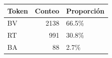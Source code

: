 \begin{tabular}{@{}lrl@{}}
\toprule
Token & Conteo & Proporción \\
\midrule
BV & 2138 & 66.5\% \\
RT & 991 & 30.8\% \\
BA & 88 & 2.7\% \\
\bottomrule
\end{tabular}
